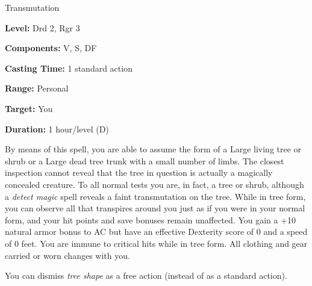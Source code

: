 
Transmutation

\textbf{Level:} Drd 2, Rgr 3

\textbf{Components:} V, S, DF

\textbf{Casting Time:} 1 standard action

\textbf{Range:} Personal

\textbf{Target:} You

\textbf{Duration:} 1 hour/level (D)

By means of this spell, you are able to assume the form of a Large living tree 
or shrub or a Large dead tree trunk with a small number of limbs. The closest inspection 
cannot reveal that the tree in question is actually a magically concealed creature. 
To all normal tests you are, in fact, a tree or shrub, although a \textit{detect 
magic} spell reveals a faint transmutation on the tree. While in tree form, you 
can observe all that transpires around you just as if you were in your normal form, 
and your hit points and save bonuses remain unaffected. You gain a +10 natural 
armor bonus to AC but have an effective Dexterity score of 0 and a speed of 0 feet. 
You are immune to critical hits while in tree form. All clothing and gear carried 
or worn changes with you.

You can dismiss \textit{tree shape} as a free action (instead of as a standard 
action).

